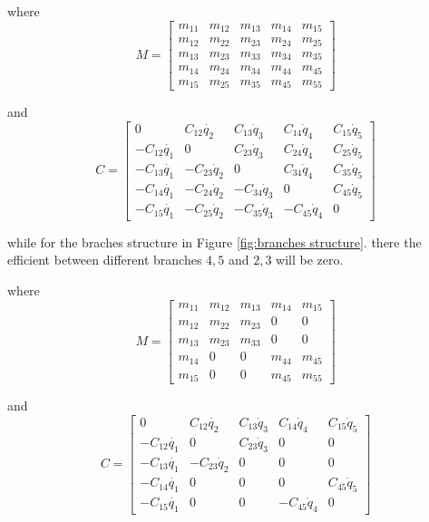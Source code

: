 {where
\[
M=\left[\begin{array}{ccccc}
m_{11} & m_{12} & m_{13} & m_{14} & m_{15}\\
m_{12} & m_{22} & m_{23} & m_{24} & m_{25}\\
m_{13} & m_{23} & m_{33} & m_{34} & m_{35}\\
m_{14} & m_{24} & m_{34} & m_{44} & m_{45}\\
m_{15} & m_{25} & m_{35} & m_{45} & m_{55}\end{array}\right]
\]

and
\[
C=\left[\begin{array}{ccccc}
0 & C_{12}\dot{q_{2}} & C_{13}\dot{q}_{3} & C_{14}\dot{q}_{4} & C_{15}\dot{q}_{5}\\
-C_{12}\dot{q_{1}} & 0 & C_{23}\dot{q}_{3} & C_{24}\dot{q}_{4} & C_{25}\dot{q}_{5}\\
-C_{13}\dot{q_{1}} & -C_{23}\dot{q}_{2} & 0 & C_{34}\dot{q}_{4} & C_{35}\dot{q}_{5}\\
-C_{14}\dot{q_{1}} & -C_{24}\dot{q}_{2} & -C_{34}\dot{q}_{3} & 0 & C_{45}\dot{q}_{5}\\
-C_{15}\dot{q_{1}} & -C_{25}\dot{q}_{2} & -C_{35}\dot{q}_{3} & -C_{45}\dot{q}_{4} & 0\end{array}\right]
\]





while for the braches structure in Figure \ref{fig:branches structure}.
there the efficient between different branches $4,5$ and $2,3$ will be zero.

where
\[
M=\left[\begin{array}{ccccc}
m_{11} & m_{12} & m_{13} & m_{14} & m_{15}\\
m_{12} & m_{22} & m_{23} & 0 & 0\\
m_{13} & m_{23} & m_{33} & 0 & 0\\
m_{14} & 0 & 0 & m_{44} & m_{45}\\
m_{15} & 0 & 0 & m_{45} & m_{55}\end{array}\right]
\]

and
\[
C=\left[\begin{array}{ccccc}
0 & C_{12}\dot{q_{2}} & C_{13}\dot{q}_{3} & C_{14}\dot{q}_{4} & C_{15}\dot{q}_{5}\\
-C_{12}\dot{q_{1}} & 0 & C_{23}\dot{q}_{3} & 0 & 0\\
-C_{13}\dot{q_{1}} & -C_{23}\dot{q}_{2} & 0 & 0 & 0\\
-C_{14}\dot{q_{1}} & 0 & 0 & 0 & C_{45}\dot{q}_{5}\\
-C_{15}\dot{q_{1}} & 0 & 0 & -C_{45}\dot{q}_{4} & 0\end{array}\right]
\]








}
